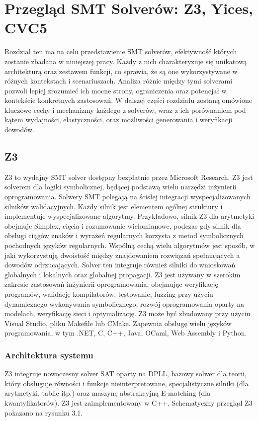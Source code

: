 \chapter{Przegląd SMT Solverów: Z3, Yices, CVC5}
Rozdział ten ma na celu przedstawienie SMT solverów, efektywność których zostanie zbadana w niniejszej pracy. Każdy z nich charakteryzuje się unikatową architekturą oraz zestawem funkcji, co sprawia, że są one wykorzystywane w różnych kontekstach i scenariuszach. Analiza różnic między tymi solverami pozwoli lepiej zrozumieć ich mocne strony, ograniczenia oraz potencjał w kontekście konkretnych zastosowań. W dalszej części rozdziału zostaną omówione kluczowe cechy i mechanizmy każdego z solverów, wraz z ich porównaniem pod kątem wydajności, elastyczności, oraz możliwości generowania i weryfikacji dowodów.

\section{Z3}
Z3 to wydajny SMT solver dostępny bezpłatnie przez Microsoft Research. Z3 jest solverem dla logiki symbolicznej, będącej podstawą wielu narzędzi inżynierii oprogramowania. Solwery SMT polegają na ścisłej integracji wyspecjalizowanych silników walidacyjnych. Każdy silnik jest elementem ogólnej struktury i implementuje wyspecjalizowane algorytmy. Przykładowo, silnik Z3 dla arytmetyki obejmuje Simplex, cięcia i rozumowanie wielomianowe, podczas gdy silnik dla obsługi ciągów znaków i wyrażeń regularnych korzysta z metod symbolicznych pochodnych języków regularnych. Wspólną cechą wielu algorytmów jest sposób, w jaki wykorzystują dwoistość między znajdowaniem rozwiązań spełniających a dowodów odrzucających. Solver ten integruje również silniki do wnioskowań globalnych i lokalnych oraz globalnej propagacji.
Z3 jest używany w szerokim zakresie zastosowań inżynierii oprogramowania, obejmując weryfikację programów, walidację kompilatorów, testowanie, fuzzing przy użyciu dynamicznego wykonywania symbolicznego, rozwój oprogramowania oparty na modelach, weryfikację sieci i optymalizację.
Z3 może być zbudowany przy użyciu Visual Studio, pliku Makefile lub CMake. Zapewnia obsługę wielu języków programowania, w tym .NET, C, C++, Java, OCaml, Web Assembly i Python.

\subsection{Architektura systemu}

Z3 integruje nowoczesny solver SAT oparty na DPLL, bazowy solwer dla teorii, który obsługuje równości i funkcje nieinterpretowane, specjalistyczne silniki (dla arytmetyki, tablic itp.) oraz maszynę abstrakcyjną E-matching (dla kwantyfikatorów). Z3 jest zaimplementowany w C++. Schematyczny przegląd Z3 pokazano na rysunku 3.1.		

